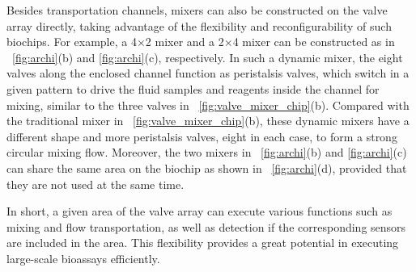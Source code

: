 
Besides transportation channels, mixers can also be constructed on 
the valve array directly, taking advantage of the flexibility and reconfigurability
of such biochips.
For example, a 4$\times$2 mixer and a 2$\times$4 mixer can be constructed as
in \figname~\ref{fig:archi}(b) and \ref{fig:archi}(c),
respectively. In such a dynamic mixer, the eight valves along the enclosed
channel function as peristalsis valves, which switch in a given pattern 
to drive the fluid samples and reagents inside the channel for mixing, similar
to the three valves in \figname~\ref{fig:valve_mixer_chip}(b).
Compared with the traditional mixer in \figname~\ref{fig:valve_mixer_chip}(b), these
dynamic mixers have a different shape and more peristalsis valves, eight in each case, to
form a strong circular mixing flow. %
Moreover, the two mixers in \figname~\ref{fig:archi}(b) and \ref{fig:archi}(c)
can share the same area on the biochip as shown in \figname~\ref{fig:archi}(d),
provided that they are not used at the same time. 

In short, a given area of the valve array can execute various functions such 
as mixing and flow transportation, as well as detection if the corresponding sensors are
included in the area. This flexibility provides a great potential in 
executing large-scale bioassays efficiently. 
